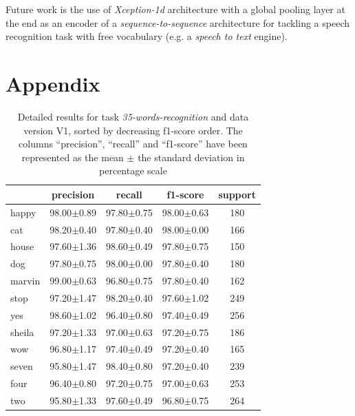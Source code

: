\documentclass[review]{elsarticle}
\begin{document}
Future work is  the use of \textit{Xception-1d} architecture with a global pooling layer at the end  as an encoder of a \textit{sequence-to-sequence} architecture for tackling a speech recognition task with free vocabulary (e.g. a \textit{speech to text} engine).


\newpage




\newpage

\section*{Appendix}

\begin{table}[h!] \centering \scriptsize
	\caption{Detailed results for task \textit{35-words-recognition} and data version V1, sorted by decreasing f1-score order. The columns ``precision'', ``recall'' and ``f1-score'' have been represented as the mean $\pm$ the standard deviation in percentage scale }
	\begin{tabular}{lcccc}
		\toprule
		{} &       precision &          recall &        f1-score & support \\
		\midrule
		happy     &  98.00$\pm$0.89 &  97.80$\pm$0.75 &  98.00$\pm$0.63 &     180 \\
		cat       &  98.20$\pm$0.40 &  97.80$\pm$0.40 &  98.00$\pm$0.00 &     166 \\
		house     &  97.60$\pm$1.36 &  98.60$\pm$0.49 &  97.80$\pm$0.75 &     150 \\
		dog       &  97.80$\pm$0.75 &  98.00$\pm$0.00 &  97.80$\pm$0.40 &     180 \\
		marvin    &  99.00$\pm$0.63 &  96.80$\pm$0.75 &  97.80$\pm$0.40 &     162 \\
		stop      &  97.20$\pm$1.47 &  98.20$\pm$0.40 &  97.60$\pm$1.02 &     249 \\
		yes       &  98.60$\pm$1.02 &  96.40$\pm$0.80 &  97.40$\pm$0.49 &     256 \\
		sheila    &  97.20$\pm$1.33 &  97.00$\pm$0.63 &  97.20$\pm$0.75 &     186 \\
		wow       &  96.80$\pm$1.17 &  97.40$\pm$0.49 &  97.20$\pm$0.40 &     165 \\
		seven     &  95.80$\pm$1.47 &  98.40$\pm$0.80 &  97.20$\pm$0.40 &     239 \\
		four      &  96.40$\pm$0.80 &  97.20$\pm$0.75 &  97.00$\pm$0.63 &     253 \\
		two       &  95.80$\pm$1.33 &  97.60$\pm$0.49 &  96.80$\pm$0.75 &     264 \\

\end{tabular}
\end{table}
\end{document}
